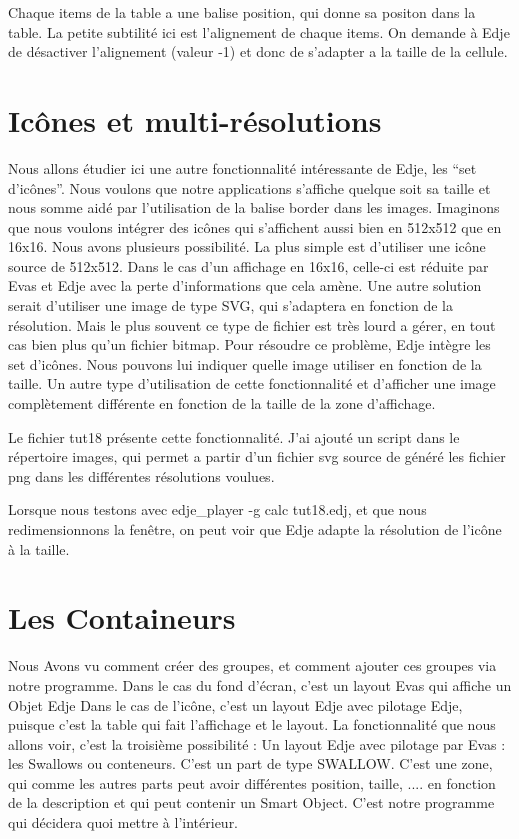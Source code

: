 \documentclass[a4paper]{efr}
\begin{document}
Chaque items de la table a une balise position, qui donne sa positon dans la
table. La petite subtilité ici est l'alignement de chaque items. On demande
à Edje de désactiver l'alignement (valeur -1) et donc de s'adapter a la taille
de la cellule.

\section{Icônes et multi-résolutions}

Nous allons étudier ici une autre fonctionnalité intéressante de Edje, les ``set
d'icônes''. Nous voulons que notre applications s'affiche quelque soit sa taille
et nous somme aidé par l'utilisation de la balise border dans les images.
Imaginons que nous voulons intégrer des icônes qui s'affichent aussi bien en
512x512 que en 16x16. Nous avons plusieurs possibilité.
La plus simple est d'utiliser une icône source de 512x512. Dans le cas d'un
affichage en 16x16, celle-ci est réduite par Evas et Edje avec la perte
d'informations que cela amène. Une autre solution serait d'utiliser une image
de type SVG, qui s'adaptera en fonction de la résolution. Mais le plus souvent
ce type de fichier est très lourd a gérer, en tout cas bien plus qu'un fichier
bitmap.
Pour résoudre ce problème, Edje intègre les set d'icônes. Nous pouvons lui
indiquer quelle image utiliser en fonction de la taille. Un autre type
d'utilisation de cette fonctionnalité et d'afficher une image complètement
différente en fonction de la taille de la zone d'affichage.

Le fichier tut18 présente cette fonctionnalité. J'ai ajouté un script dans le
répertoire images, qui permet a partir d'un fichier svg source de généré les
fichier png dans les différentes résolutions voulues.

Lorsque nous testons avec edje\_player -g calc tut18.edj, et que nous
redimensionnons la fenêtre, on peut voir que Edje adapte la résolution de
l'icône à la taille.

\section{Les Containeurs}

Nous Avons vu comment créer des groupes, et comment ajouter ces groupes via
notre programme.
Dans le cas du fond d'écran, c'est un layout Evas qui affiche un Objet Edje
Dans le cas de l'icône, c'est un layout Edje avec pilotage Edje, puisque c'est
la table qui fait l'affichage et le layout.
La fonctionnalité que nous allons voir, c'est la troisième possibilité :
Un layout Edje avec pilotage par Evas : les Swallows ou conteneurs.
C'est un part de type SWALLOW. C'est une zone, qui comme les autres parts peut
avoir différentes position, taille, .... en fonction de la description et qui
peut contenir un Smart Object. C'est notre programme qui décidera quoi mettre
à l'intérieur.
\end{document}
